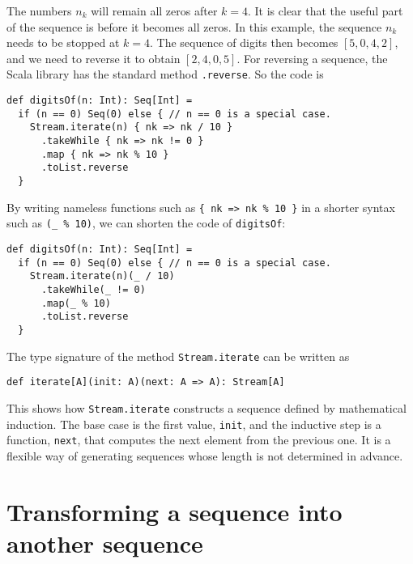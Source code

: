 The numbers $n_{k}$ will remain all zeros after $k=4$. It is clear
that the useful part of the sequence is before it becomes all zeros.
In this example, the sequence $n_{k}$ needs to be stopped at $k=4$.
The sequence of digits then becomes $\left[5,0,4,2\right]$, and we
need to reverse it to obtain $\left[2,4,0,5\right]$. For reversing
a sequence, the Scala library has the standard method \lstinline!.reverse!.
So the code is
\begin{lstlisting}
def digitsOf(n: Int): Seq[Int] =
  if (n == 0) Seq(0) else { // n == 0 is a special case.
    Stream.iterate(n) { nk => nk / 10 }
      .takeWhile { nk => nk != 0 }
      .map { nk => nk % 10 }
      .toList.reverse
  }
\end{lstlisting}
By writing nameless functions such as \lstinline!{ nk => nk % 10 }!
in a shorter syntax such as \lstinline!(_ % 10)!,
we can shorten the code of \lstinline!digitsOf!:
\begin{lstlisting}
def digitsOf(n: Int): Seq[Int] =
  if (n == 0) Seq(0) else { // n == 0 is a special case.
    Stream.iterate(n)(_ / 10)
      .takeWhile(_ != 0)
      .map(_ % 10)
      .toList.reverse
  }
\end{lstlisting}
The type signature of the method \lstinline!Stream.iterate!
can be written as
\begin{lstlisting}
def iterate[A](init: A)(next: A => A): Stream[A]
\end{lstlisting}
This shows how \lstinline!Stream.iterate!
constructs a sequence defined by mathematical induction. The base
case is the first value, \lstinline!init!,
and the inductive step is a function, \lstinline!next!,
that computes the next element from the previous one. It is a flexible
way of generating sequences whose length is not determined in advance.

\section{Transforming a sequence into another sequence}

